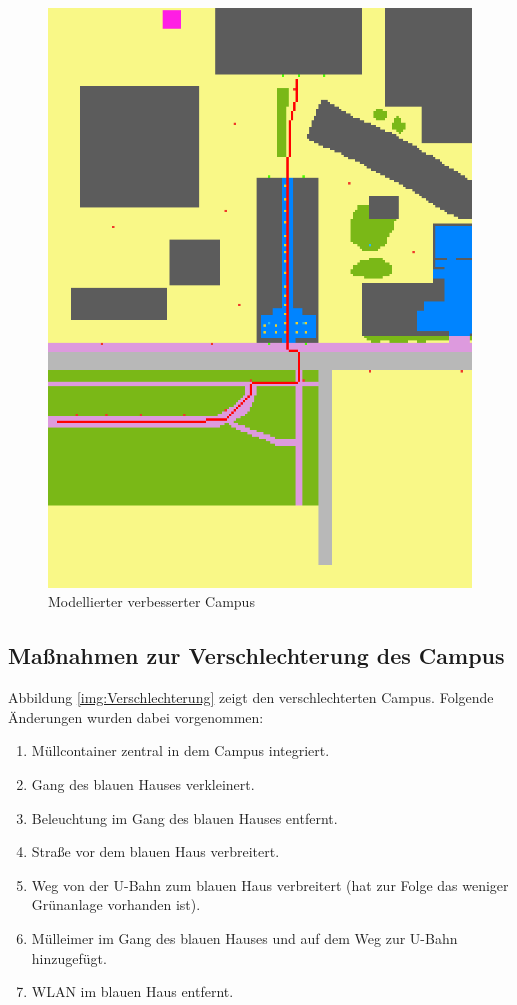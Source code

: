 \documentclass[10pt]{scrartcl}
\begin{document}
	\begin{figure}[H]
                \includegraphics[width=\textwidth]{Verbesserung}
        \caption{Modellierter verbesserter Campus}
        \label{img:Verbesserung}
	\end{figure}
	
\subsection{Maßnahmen zur Verschlechterung des Campus}
Abbildung \ref{img:Verschlechterung} zeigt den verschlechterten Campus. Folgende Änderungen wurden dabei vorgenommen:

\begin{enumerate}
\item Müllcontainer zentral in dem Campus integriert.
\item Gang des blauen Hauses verkleinert.
\item Beleuchtung im Gang des blauen Hauses entfernt.
\item Straße vor dem blauen Haus verbreitert.
\item Weg von der U-Bahn zum blauen Haus verbreitert (hat zur Folge das weniger Grünanlage vorhanden ist).
\item Mülleimer im Gang des blauen Hauses und auf dem Weg zur U-Bahn hinzugefügt.
\item WLAN im blauen Haus entfernt.
\end{enumerate}
\end{document}
